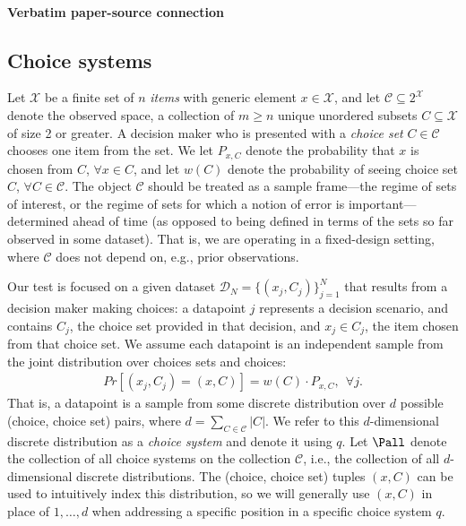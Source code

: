 \documentclass[10pt]{article}
\begin{document}
\paragraph{Verbatim paper-source connection}
\begin{ReviewVerbatim}
\subsection{Choice systems}\label{subsection:choice_system}
	Let $\mathcal{X}$ be a finite set of $n$ \textit{items} with generic element $x \in \mathcal{X}$, and let $\mathcal{C} \subseteq 2^\mathcal{X}$ denote the observed space, a collection of $m \geq n$ unique unordered subsets $C \subseteq \mathcal{X}$ of size 2 or greater. A decision maker who is presented with a \textit{choice set} $C \in \mathcal{C}$ chooses one item from the set. We let $P_{x,C}$ denote the probability that $x$ is chosen from $C$, $\forall x \in C$, and let $w(C)$ denote the probability of seeing choice set $C$, $\forall C \in \mathcal{C}$. The object $\mathcal{C}$ should be treated as a sample frame---the regime of sets of interest, or the regime of sets for which a notion of error is important---determined ahead of time (as opposed to being defined in terms of the sets so far observed in some dataset). That is, we are operating in a fixed-design setting, where $\mathcal{C}$ does not depend on, e.g., prior observations.

	Our test is focused on a given dataset $\mathcal{D}_N = \lbrace (x_j, C_j) \rbrace_{j=1}^N$ that results from a decision maker making choices: a datapoint $j$ represents a decision scenario, and contains $C_j$, the choice set provided in that decision, and $x_j \in C_j$, the item chosen from that choice set. We assume each datapoint is an independent sample from the joint distribution over choices sets and choices:
	\begin{align*}
	Pr[(x_j, C_j) = (x, C)] = w(C) \cdot P_{x,C}, \ \ \forall j.
	\end{align*}
	That is, a datapoint is a sample from some discrete distribution over $d$ possible (choice, choice set) pairs, where $d = \sum_{C \in \mathcal{C}} |C|$. We refer to this $d$-dimensional discrete distribution as a \textit{choice system} and denote it using $q$.
	Let $\Pall$ denote the collection of all choice systems on the collection $\mathcal{C}$, i.e., the collection of all $d$-dimensional discrete distributions. The (choice, choice set) tuples $(x,C)$ can be used to intuitively index this distribution, so we will generally use $(x,C)$ in place of $1,\ldots,d$ when addressing a specific position in a specific choice system $q$.



\end{ReviewVerbatim}
\end{document}
